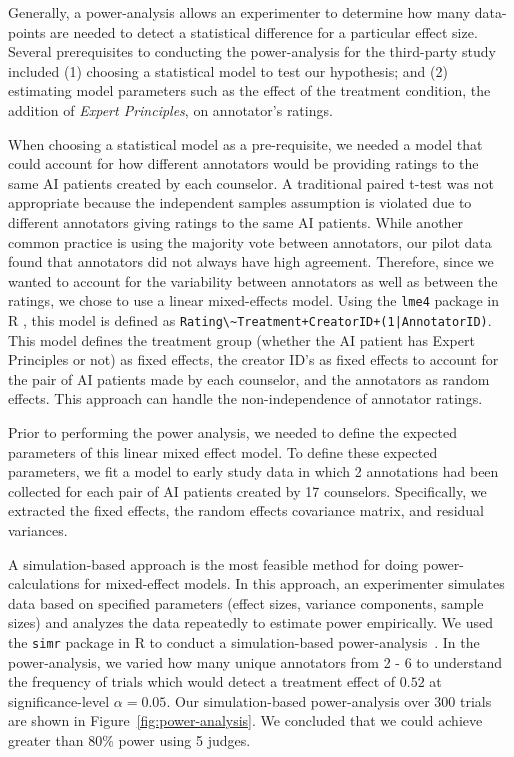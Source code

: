 \documentclass[11pt]{article}
\begin{document}
Generally, a power-analysis allows an experimenter to determine how many data-points are needed to detect a statistical difference for a particular effect size. Several prerequisites to conducting the power-analysis for the third-party study included (1) choosing a statistical model to test our hypothesis; and (2) estimating model parameters such as the effect of the treatment condition, the addition of  \textit{Expert Principles}, on annotator's ratings.

When choosing a statistical model as a pre-requisite, we needed a model that could account for how different annotators would be providing ratings to the same AI patients created by each counselor. A traditional paired t-test was not appropriate because the independent samples assumption is violated due to different annotators giving ratings to the same AI patients. While another common practice is using the majority vote between annotators, our pilot data found that annotators did not always have high agreement. Therefore, since we wanted to account for the variability between annotators as well as between the ratings, we chose to use a linear mixed-effects model.  Using the \lstinline!lme4! package in R \cite{bates2015package}, this model is defined as \lstinline!Rating\~Treatment+CreatorID+(1|AnnotatorID)!.  This model defines the treatment group (whether the AI patient has Expert Principles or not) as fixed effects, the creator ID's as fixed effects to account for the pair of AI patients made by each counselor, and the annotators as random effects. This approach can handle the non-independence of annotator ratings.

Prior to performing the power analysis, we needed to define the expected parameters of this linear mixed effect model. To define these expected parameters, we fit a model to early study data in which 2 annotations had been collected for each pair of AI patients created by 17 counselors. Specifically, we extracted the fixed effects, the random effects covariance matrix, and residual variances. 

A simulation-based approach is the most feasible method for doing power-calculations for mixed-effect models. In this approach, an experimenter simulates data based on specified parameters (effect sizes, variance components, sample sizes) and analyzes the data repeatedly to estimate power empirically. We used the \lstinline!simr! package in R to conduct a simulation-based power-analysis~\cite{green2016simr}. In the power-analysis, we varied how many unique annotators from 2 - 6 to understand the frequency of trials which would detect a treatment effect of $0.52$ at significance-level $\alpha=0.05$. Our simulation-based power-analysis over 300 trials are shown in Figure~\ref{fig:power-analysis}. We concluded that we could achieve greater than 80\% power using 5 judges. 
\end{document}
